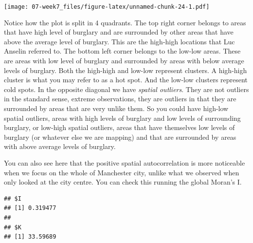 \documentclass[]{book}
\newenvironment{Shaded}{\begin{snugshade}}{\end{snugshade}}
\newcommand{\DataTypeTok}[1]{\textcolor[rgb]{0.13,0.29,0.53}{#1}}
\newcommand{\DecValTok}[1]{\textcolor[rgb]{0.00,0.00,0.81}{#1}}
\newcommand{\KeywordTok}[1]{\textcolor[rgb]{0.13,0.29,0.53}{\textbf{#1}}}
\newcommand{\NormalTok}[1]{#1}
\newcommand{\OperatorTok}[1]{\textcolor[rgb]{0.81,0.36,0.00}{\textbf{#1}}}
\begin{document}
\texttt{[image: 07-week7\_files/figure-latex/unnamed-chunk-24-1.pdf]}

Notice how the plot is split in 4 quadrants. The top right corner belongs to areas that have high level of burglary and are surrounded by other areas that have above the average level of burglary. This are the high-high locations that Luc Anselin referred to. The bottom left corner belongs to the low-low areas. These are areas with low level of burglary and surrounded by areas with below average levels of burglary. Both the high-high and low-low represent clusters. A high-high cluster is what you may refer to as a hot spot. And the low-low clusters represent cold spots. In the opposite diagonal we have \emph{spatial outliers}. They are not outliers in the standard sense, extreme observations, they are outliers in that they are surrounded by areas that are very unlike them. So you could have high-low spatial outliers, areas with high levels of burglary and low levels of surrounding burglary, or low-high spatial outliers, areas that have themselves low levels of burglary (or whatever else we are mapping) and that are surrounded by areas with above average levels of burglary.

You can also see here that the positive spatial autocorrelation is more noticeable when we focus on the whole of Manchester city, unlike what we observed when only looked at the city centre. You can check this running the global Moran's I.

\begin{Shaded}
\end{Shaded}

\begin{verbatim}
## $I
## [1] 0.319477
## 
## $K
## [1] 33.59689
\end{verbatim}

\begin{Shaded}
\end{Shaded}
\end{document}
